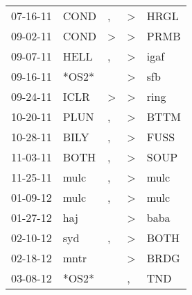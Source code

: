 \begin{supertabular}{p{0.07\textwidth}p{0.06\textwidth}p{0.02\textwidth}p{0.02\textwidth}p{0.06\textwidth}}
          07-16-11\textsuperscript{} &           COND\textsuperscript{} &                , &     \textgreater &           HRGL\textsuperscript{} \\
          09-02-11\textsuperscript{} &           COND\textsuperscript{} &     \textgreater &     \textgreater &           PRMB\textsuperscript{} \\
          09-07-11\textsuperscript{} &           HELL\textsuperscript{} &                , &     \textgreater &           igaf\textsuperscript{} \\
          09-16-11\textsuperscript{} &                            *OS2* &                  &     \textgreater &            sfb\textsuperscript{} \\
          09-24-11\textsuperscript{} &           ICLR\textsuperscript{} &     \textgreater &     \textgreater &           ring\textsuperscript{} \\
          10-20-11\textsuperscript{} &           PLUN\textsuperscript{} &                , &     \textgreater &           BTTM\textsuperscript{} \\
          10-28-11\textsuperscript{} &           BILY\textsuperscript{} &                , &     \textgreater &           FUSS\textsuperscript{} \\
          11-03-11\textsuperscript{} &           BOTH\textsuperscript{} &                , &     \textgreater &           SOUP\textsuperscript{} \\
          11-25-11\textsuperscript{} &           mulc\textsuperscript{} &                , &     \textgreater &           mulc\textsuperscript{} \\
          01-09-12\textsuperscript{} &           mulc\textsuperscript{} &                , &     \textgreater &           mulc\textsuperscript{} \\
          01-27-12\textsuperscript{} &            haj\textsuperscript{} &                  &     \textgreater &           baba\textsuperscript{} \\
          02-10-12\textsuperscript{} &            syd\textsuperscript{} &                , &     \textgreater &           BOTH\textsuperscript{} \\
          02-18-12\textsuperscript{} &           mntr\textsuperscript{} &                  &     \textgreater &           BRDG\textsuperscript{} \\
          03-08-12\textsuperscript{} &                            *OS2* &                  &                , &            TND\textsuperscript{} \\

\end{supertabular}
